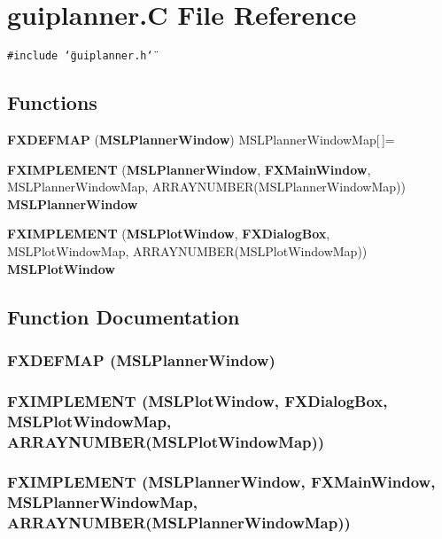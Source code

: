 \section{guiplanner.C File Reference}
\label{guiplanner_8C}
{\tt \#include \char`\"{}guiplanner.h\char`\"{}}\par
\subsection*{Functions}
\begin{CompactItemize}
\item 
{\bf FXDEFMAP} ({\bf MSLPlanner\-Window}) MSLPlanner\-Window\-Map[$\,$]=
\item 
{\bf FXIMPLEMENT} ({\bf MSLPlanner\-Window}, {\bf FXMain\-Window}, MSLPlanner\-Window\-Map, ARRAYNUMBER(MSLPlanner\-Window\-Map)) {\bf MSLPlanner\-Window}
\item 
{\bf FXIMPLEMENT} ({\bf MSLPlot\-Window}, {\bf FXDialog\-Box}, MSLPlot\-Window\-Map, ARRAYNUMBER(MSLPlot\-Window\-Map)) {\bf MSLPlot\-Window}
\end{CompactItemize}


\subsection{Function Documentation}
\subsubsection{\setlength{\rightskip}{0pt plus 5cm}FXDEFMAP ({\bf MSLPlanner\-Window})}\label{guiplanner_8C_a0}


\subsubsection{\setlength{\rightskip}{0pt plus 5cm}FXIMPLEMENT ({\bf MSLPlot\-Window}, {\bf FXDialog\-Box}, MSLPlot\-Window\-Map, ARRAYNUMBER(MSLPlot\-Window\-Map))}\label{guiplanner_8C_a2}


\subsubsection{\setlength{\rightskip}{0pt plus 5cm}FXIMPLEMENT ({\bf MSLPlanner\-Window}, {\bf FXMain\-Window}, MSLPlanner\-Window\-Map, ARRAYNUMBER(MSLPlanner\-Window\-Map))}\label{guiplanner_8C_a1}


